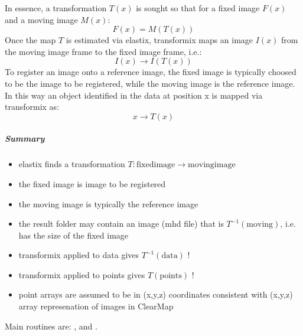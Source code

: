\documentclass[letterpaper,10pt,english]{sphinxmanual}
\begin{document}
In essence, a transformation $T(x)$ is sought so that for a fixed image
$F(x)$ and a moving image $M(x)$:
\begin{equation}F(x) = M(T(x))\end{equation}
Once the map $T$ is estimated via elastix, transformix maps an image
$I(x)$ from the moving image frame to the fixed image frame, i.e.:
\begin{equation}I(x) \rightarrow I(T(x))\end{equation}
To register an image onto a reference image, the fixed image is typically
choosed to be the image to be registered, while the moving image is the
reference image. In this way an object identified in the data at position x
is mapped via transformix as:
\begin{equation}x \rightarrow T(x)\end{equation}

\subparagraph{Summary}
\label{api/ClearMap.Alignment:summary}\begin{itemize}
\item {} 
elastix finds a transformation $T: \mathrm{fixed image} \rightarrow \mathrm{moving image}$

\item {} 
the fixed image is image to be registered

\item {} 
the moving image is typically the reference image

\item {} 
the result folder may contain an image (mhd file) that is $T^{-1}(\mathrm{moving})$,
i.e. has the size of the fixed image

\item {} 
transformix applied to data gives $T^{-1}(\mathrm{data})$ !

\item {} 
transformix applied to points gives $T(\mathrm{points})$ !

\item {} 
point arrays are assumed to be in (x,y,z) coordinates consistent with (x,y,z) array represenation of images in ClearMap

\end{itemize}

Main routines are: {\hyperref[api/ClearMap.Alignment:ClearMap.Alignment.Elastix.alignData]{\emph{}}}, {\hyperref[api/ClearMap.Alignment:ClearMap.Alignment.Elastix.transformData]{\emph{}}} and {\hyperref[api/ClearMap.Alignment:ClearMap.Alignment.Elastix.transformPoints]{\emph{}}}.
\end{document}
